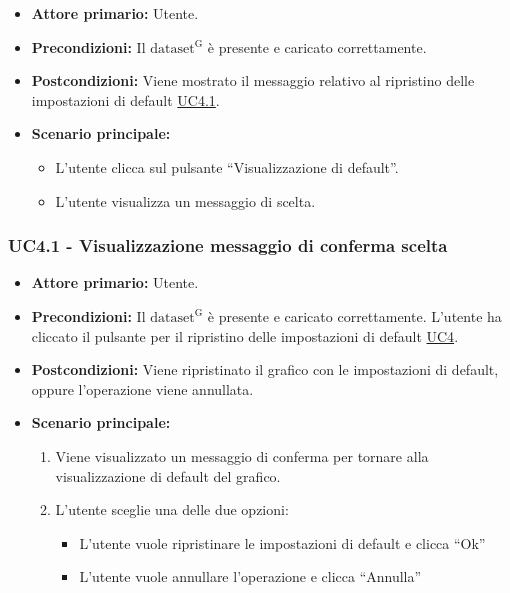 \begin{itemize}
	\item \textbf{Attore primario:} Utente.
	\item \textbf{Precondizioni:} Il ${\mathrm{dataset^{G}}}$ è presente e caricato correttamente.
	\item \textbf{Postcondizioni:} Viene mostrato il messaggio relativo al ripristino delle impostazioni di default \hyperref[sec:UC4.1]{UC4.1}.
	\item \textbf{Scenario principale:}
	\begin{itemize}
		\item L'utente clicca sul pulsante ``Visualizzazione di default''.
		\item L'utente visualizza un messaggio di scelta.
	\end{itemize}
\end{itemize}

\subsubsection{UC4.1 - Visualizzazione messaggio di conferma scelta}
\label{sec:UC4.1}
\begin{itemize}
	\item \textbf{Attore primario:} Utente.
	\item \textbf{Precondizioni:} Il ${\mathrm{dataset^{G}}}$ è presente e caricato correttamente. L'utente ha cliccato il pulsante per il ripristino delle impostazioni di default \hyperref[sec:UC4]{UC4}.
	\item \textbf{Postcondizioni:} Viene ripristinato il grafico con le impostazioni di default, oppure l'operazione viene annullata.
	\item \textbf{Scenario principale:}
		\begin{enumerate}
		\item Viene visualizzato un messaggio di conferma per tornare alla visualizzazione di default del grafico.
		\item L'utente sceglie una delle due opzioni:
			\begin{itemize}
				\item L'utente vuole ripristinare le impostazioni di default e clicca ``Ok''
				\item L'utente vuole annullare l'operazione e clicca ``Annulla''
			\end{itemize}
		\end{enumerate}
\end{itemize}

